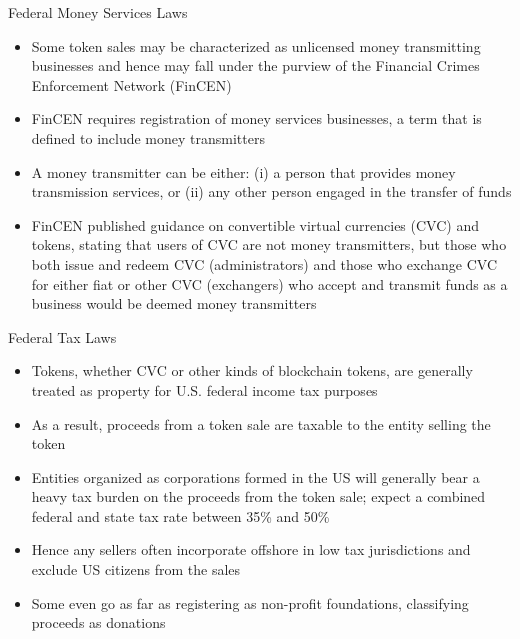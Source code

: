 \documentclass[9pt]{beamer}
\begin{document}


\begin{frame}{Federal Money Services Laws}
	\begin{itemize}
		\item Some token sales may be characterized as unlicensed money transmitting businesses and hence may fall under the purview of the Financial Crimes Enforcement Network (FinCEN)
		\item FinCEN requires registration of money services businesses, a term that is defined to include money transmitters
		\item A money transmitter can be either: (i) a person that provides money transmission services, or (ii) any other person engaged in the transfer of funds
		\item FinCEN published guidance on convertible virtual currencies (CVC) and tokens, stating that users of CVC are not money transmitters, but those who both issue and redeem CVC (administrators) and those who exchange CVC for either fiat or other CVC (exchangers) who accept and transmit funds as a business would be deemed money transmitters
	\end{itemize}
\end{frame}


\begin{frame}{Federal Tax Laws}
	\begin{itemize}
		\item Tokens, whether CVC or other kinds of blockchain tokens, are generally treated as property for U.S. federal income tax purposes
		\item As a result, proceeds from a token sale are taxable to the entity selling the token
		\item Entities organized as corporations formed in the US will generally bear a heavy tax burden on the proceeds from the token sale; expect a combined federal and state tax rate between 35\% and 50\%
		\item Hence any sellers often incorporate offshore in low tax jurisdictions and exclude US citizens from the sales
		\item Some even go as far as registering as non-profit foundations, classifying proceeds as donations
	\end{itemize}
\end{frame}
\end{document}
